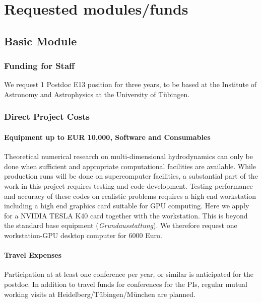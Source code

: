 \documentclass[10pt,fleqn,twoside]{article}
\begin{document}
\section{Requested modules/funds}
\renewcommand{\leftmark}{\sc Requested modules/funds}

\subsection{Basic Module}

\subsubsection{Funding for Staff}

We request 1 Postdoc E13 position for three years, to be based at the Institute of Astronomy
and Astrophysics at the University of T\"ubingen.

\subsubsection{Direct Project Costs}

\paragraph{Equipment up to EUR 10,000, Software and Consumables}
Theoretical numerical research on multi-dimensional hydrodynamics can only be done when sufficient and
appropriate computational facilities are available. While production runs
will be done on supercomputer facilities, a substantial part of the work in
this project requires testing and code-development.
Testing performance and accuracy of these codes on realistic problems
requires a high end workstation including a high end graphics card suitable for
GPU computing. Here we apply for a NVIDIA TESLA K40 card together with the workstation.
This is beyond the standard base equipment (\textit{Grundausstattung}).
We therefore request one workstation-GPU desktop computer for 6000 Euro.

\paragraph{Travel Expenses}
Participation at at least one conference per year, or similar is anticipated
for the postdoc. In addition to travel funds for conferences for the PIs,
regular mutual working visits at Heidelberg/T\"ubingen/M\"unchen are
planned.
\end{document}
